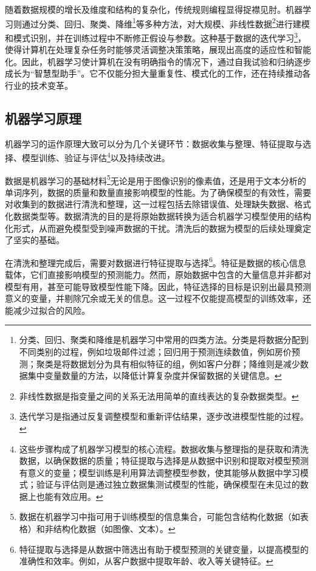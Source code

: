 随着数据规模的增长及维度和结构的复杂化，传统规则编程显得捉襟见肘。机器学习则通过分类、回归、聚类、降维\footnote{分类、回归、聚类和降维是机器学习中常用的四类方法。分类是将数据分配到不同类别的过程，例如垃圾邮件过滤；回归用于预测连续数值，例如房价预测；聚类是将数据划分为具有相似特征的组，例如客户分群；降维则是减少数据集中变量数量的方法，以降低计算复杂度并保留数据的关键信息。}等多种方法，对大规模、非线性数据\footnote{非线性数据是指变量之间的关系无法用简单的直线表达的复杂数据类型。}进行建模和模式识别，并在训练过程中不断修正假设与参数。这种基于数据的迭代学习\footnote{迭代学习是指通过反复调整模型和重新评估结果，逐步改进模型性能的过程。}，使得计算机在处理复杂任务时能够灵活调整决策策略，展现出高度的适应性和智能化。因此，机器学习使计算机在没有明确指令的情况下，通过自我试验和归纳逐步成长为“智慧型助手”。它不仅能分担大量重复性、模式化的工作，还在持续推动各行业的技术变革。

\subsection{机器学习原理}

机器学习的运作原理大致可以分为几个关键环节：数据收集与整理、特征提取与选择、模型训练、验证与评估\footnote{这些步骤构成了机器学习模型的核心流程。数据收集与整理指的是获取和清洗数据，以确保数据的质量；特征提取与选择是从数据中识别和提取对模型预测有意义的变量；模型训练是利用算法调整模型参数，使其能够从数据中学习模式；验证与评估则是通过独立数据集测试模型的性能，确保模型在未见过的数据上也能有效应用。}以及持续改进。

数据是机器学习的基础材料\footnote{数据在机器学习中指可用于训练模型的信息集合，可能包含结构化数据（如表格）和非结构化数据（如图像、文本）。}无论是用于图像识别的像素值，还是用于文本分析的单词序列，数据的质量和数量直接影响模型的性能。为了确保模型的有效性，需要对收集到的数据进行清洗和整理，这一过程包括去除错误值、处理缺失数据、格式化数据类型等。数据清洗的目的是将原始数据转换为适合机器学习模型使用的结构化形式，从而避免模型受到噪声数据的干扰。清洗后的数据为模型的后续处理奠定了坚实的基础。

在清洗和整理完成后，需要对数据进行特征提取与选择\footnote{特征提取与选择是从数据中筛选出有助于模型预测的关键变量，以提高模型的准确性和效率。例如，从客户数据中提取年龄、收入等关键特征。}。特征是数据的核心信息载体，它们直接影响模型的预测能力。然而，原始数据中包含的大量信息并非都对模型有用，甚至可能导致模型性能下降。因此，特征选择的目标是识别出最具预测意义的变量，并剔除冗余或无关的信息。这一过程不仅能提高模型的训练效率，还能减少过拟合的风险。

